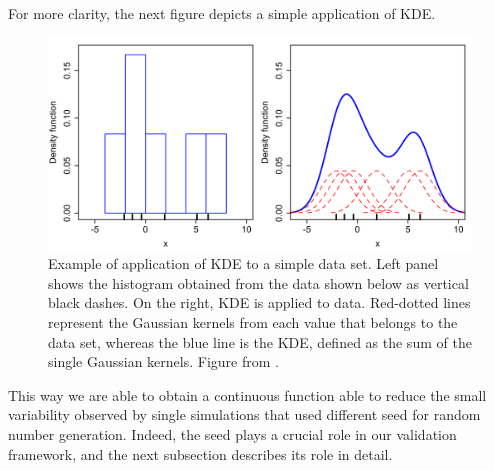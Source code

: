 \documentclass[a4paper, 12pt, twoside, openright]{book}
\begin{document}
For more clarity, the next figure depicts a simple application of KDE.
\begin{figure}[H]
    \centering
    \includegraphics[width=0.8\columnwidth]{figures/KDE_example.png}
    \caption{Example of application of KDE to a simple data set. Left panel shows the histogram obtained from the data shown below as vertical black dashes. On the right, KDE is applied to data. Red-dotted lines represent the Gaussian kernels from each value that belongs to the data set, whereas the blue line is the KDE, defined as the sum of the single Gaussian kernels. Figure from \cite{kde_wiki}.}
    \label{fig:kde}
\end{figure}

This way we are able to obtain a continuous function able to reduce the small variability observed by single simulations that used different seed for random number generation. Indeed, the seed plays a crucial role in our validation framework, and the next subsection describes its role in detail.
\end{document}
